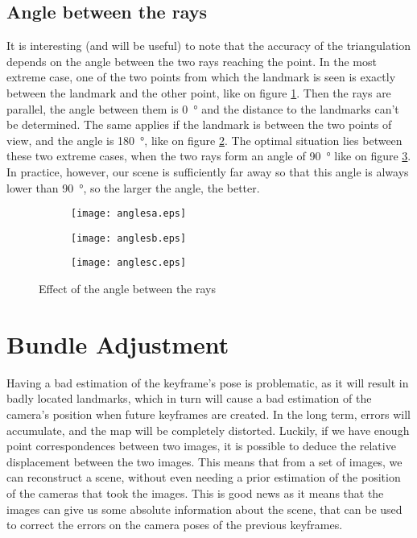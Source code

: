 \subsection{Angle between the rays}
It is interesting (and will be useful) to note that the accuracy of the triangulation depends on the angle between the two rays reaching the point. In the most extreme case, one of the two points from which the landmark is seen is exactly between the landmark and the other point, like on figure \ref{fig:anglesa}. Then the rays are parallel, the angle between them is \SI{0}{\degree} and the distance to the landmarks can't be determined. The same applies if the landmark is between the two points of view, and the angle is \SI{180}{\degree}, like on figure \ref{fig:anglesb}. The optimal situation lies between these two extreme cases, when the two rays form an angle of \SI{90}{\degree} like on figure \ref{fig:anglesc}. In practice, however, our scene is sufficiently far away so that this angle is always lower than \SI{90}{\degree}, so the larger the angle, the better.
\begin{figure}[H]
\centering
\begin{subfigure}{.28\textwidth}
  \centering
  \texttt{[image: anglesa.eps]}
  \caption{}
  \label{fig:anglesa}
\end{subfigure}%
\begin{subfigure}{.28\textwidth}
  \centering
  \texttt{[image: anglesb.eps]}
  \caption{}
  \label{fig:anglesb}
\end{subfigure}%
\begin{subfigure}{.28\textwidth}
  \centering
  \texttt{[image: anglesc.eps]}
  \caption{}
  \label{fig:anglesc}
\end{subfigure}%
\caption{Effect of the angle between the rays}
\label{fig:angles}
\end{figure}

\section{Bundle Adjustment}\label{sec:bundleadjustment}
Having a bad estimation of the keyframe's pose is problematic, as it will result in badly located landmarks, which in turn will cause a bad estimation of the camera's position when future keyframes are created. In the long term, errors will accumulate, and the map will be completely distorted. Luckily, if we have enough point correspondences between two images, it is possible to deduce the relative displacement between the two images. This means that from a set of images, we can reconstruct a scene, without even needing a prior estimation of the position of the cameras that took the images. This is good news as it means that the images can give us some absolute information about the scene, that can be used to correct the errors on the camera poses of the previous keyframes.\\

